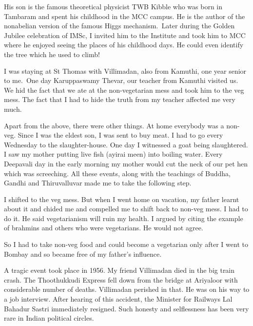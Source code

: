  
His son is the famous theoretical physicist TWB Kibble	who was born in 
Tambaram and spent his childhood in the MCC campus. He is the author of 
the nonabelian version of the famous Higgs mechanism.\ Later during the 
Golden Jubilee celebration of IMSc, I invited him to the Institute and 
took him to MCC where he enjoyed seeing the places of his childhood 
days. He could even identify the tree which he used to climb!

\vspace{.1cm}
  
I was staying at St Thomas with Villimadan, also from Kamuthi, one year 
senior to me.\ One day Karuppaswamy Thevar, our teacher from Kamuthi 
visited us. We hid the fact that we ate at the non-vegetarian mess and 
took him to the veg mess. The fact that I had to hide the truth from my 
teacher affect\-ed me very much.

\vspace{.1cm}

Apart from the above, there were other things. At home every\-body was a 
non-veg. Since I was the eldest son, I was sent to buy meat. I had to go 
every Wednesday to the slaughter-house. One day I witnessed a goat being 
slaughtered. I saw my mother putting live fish (ayirai meen) into 
boiling water. Every Deepa\-vali day in the early morning my mother would 
cut the neck of our pet hen which was screeching. All these events, 
along with the teachings of Buddha, Gandhi and Thiruvalluvar made me to 
take the following step.

\vspace{.1cm}
I shifted to the veg mess. But when I went home on vacation, my father 
learnt about it and chided me and compelled me to shift back to non-veg 
mess. I had to do it. He said vegetarianism will ruin my health. I 
argued by citing the example of brahmins and others who were 
vegetarians. He would not agree.

\vspace{.1cm}

So I had to take non-veg food and could become a vegetarian only after I 
went to Bombay and so became free of my father's influence.

\vspace{.1cm}
 
A tragic event took place in 1956. My friend Villimadan died in the big 
train crash. The Thoothukkudi Express fell down from the bridge at 
Ariyaloor with considerable number of deaths. Vi\-llimadan perished in 
that. He was on his way to a job interview. After hearing of this 
accident, the Minister for Railways Lal Bahadur Sastri immediately 
resigned. Such honesty and selflessness has been very rare in Indian 
political circles.

